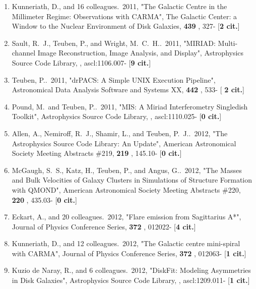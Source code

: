 \documentclass[11pt,letterpaper]{article}
\begin{document}
\begin{enumerate}[resume,label=\textbf{\arabic*}.]
\item  
Kunneriath, D., and 16 colleagues.\  2011,  "The Galactic Centre in the 
Millimeter Regime: Observations with CARMA", The Galactic Center: a Window 
to the Nuclear Environment of Disk Galaxies,  {\bf 439} , 327- [{\bf 2 
cit.}] 

\item  
Sault, R.~J., Teuben, P., and Wright, M.~C.~H..\  2011,  "MIRIAD: 
Multi-channel Image Reconstruction, Image Analysis, and Display", 
Astrophysics Source Code Library,  , ascl:1106.007- [{\bf 9 cit.}] 

\item  
Teuben, P..\  2011,  "drPACS: A Simple UNIX Execution Pipeline", 
Astronomical Data Analysis Software and Systems XX,  {\bf 442} , 533- [{\bf 
2 cit.}] 

\item  
Pound, M.~and Teuben, P..\  2011,  "MIS: A Miriad Interferometry Singledish 
Toolkit", Astrophysics Source Code Library,  , ascl:1110.025- [{\bf 0 
cit.}] 

\item  
Allen, A., Nemiroff, R.~J., Shamir, L., and Teuben, P.~J..\  2012,  "The 
Astrophysics Source Code Library: An Update", American Astronomical Society 
Meeting Abstracts \#219,  {\bf 219} , 145.10- [{\bf 0 cit.}] 

\item  
McGaugh, S.~S., Katz, H., Teuben, P., and Angus, G..\  2012,  "The Masses 
and Bulk Velocities of Galaxy Clusters in Simulations of Structure 
Formation with QMOND", American Astronomical Society Meeting Abstracts 
\#220,  {\bf 220} , 435.03- [{\bf 0 cit.}] 

\item  
Eckart, A., and 20 colleagues.\  2012,  "Flare emission from Sagittarius 
A*", Journal of Physics Conference Series,  {\bf 372} , 012022- [{\bf 4 
cit.}] 

\item  
Kunneriath, D., and 12 colleagues.\  2012,  "The Galactic centre 
mini-spiral with CARMA", Journal of Physics Conference Series,  {\bf 372} , 
012063- [{\bf 1 cit.}] 

\item  
Kuzio de Naray, R., and 6 colleagues.\  2012,  "DiskFit: Modeling 
Asymmetries in Disk Galaxies", Astrophysics Source Code Library,  , 
ascl:1209.011- [{\bf 1 cit.}] 


\end{enumerate}
\end{document}
